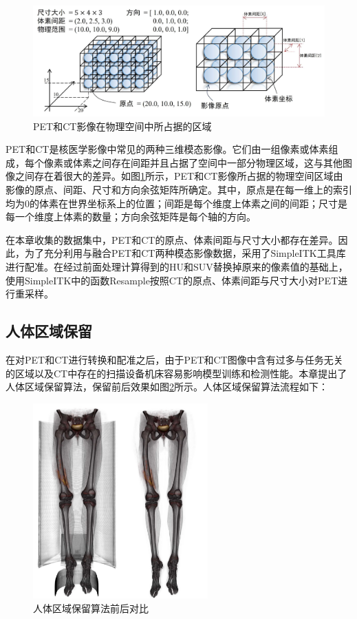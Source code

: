 \begin{figure}[htbp]
  \centering
  \includegraphics[width=\textwidth]{figures/chap04_image.jpg}
  \caption{PET和CT影像在物理空间中所占据的区域}
  \label{fig:chap04_image}
\end{figure}

PET和CT是核医学影像中常见的两种三维模态影像。它们由一组像素或体素组成，每个像素或体素之间存在间距并且占据了空间中一部分物理区域，这与其他图像之间存在着很大的差异。如图\ref{fig:chap04_image}所示，PET和CT影像所占据的物理空间区域由影像的原点、间距、尺寸和方向余弦矩阵所确定。其中，原点是在每一维上的索引均为0的体素在世界坐标系上的位置；间距是每个维度上体素之间的间距；尺寸是每一个维度上体素的数量；方向余弦矩阵是每个轴的方向。

在本章收集的数据集中，PET和CT的原点、体素间距与尺寸大小都存在差异。因此，为了充分利用与融合PET和CT两种模态影像数据，采用了SimpleITK工具库\cite{yaniv2018simpleitk}进行配准。在经过前面处理计算得到的HU和SUV替换掉原来的像素值的基础上，使用SimpleITK中的函数Resample按照CT的原点、体素间距与尺寸大小对PET进行重采样。

\subsection{人体区域保留}

在对PET和CT进行转换和配准之后，由于PET和CT图像中含有过多与任务无关的区域以及CT中存在的扫描设备机床容易影响模型训练和检测性能。本章提出了人体区域保留算法，保留前后效果如图\ref{fig:chap04_body_retent}所示。人体区域保留算法流程如下：

\begin{figure}[htbp]
  \centering
  \includegraphics[width=0.6\textwidth]{figures/chap04_body_retent.jpg}
  \caption{人体区域保留算法前后对比}
  \label{fig:chap04_body_retent}
\end{figure}


